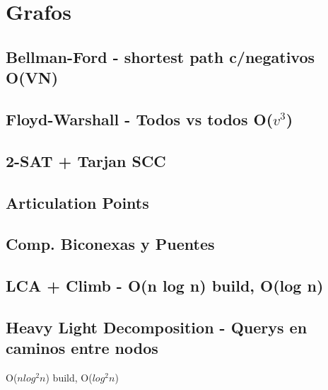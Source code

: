 \section{Grafos}%
\subsection{Bellman-Ford - shortest path c/negativos O(VN)}
\subsection{Floyd-Warshall - Todos vs todos O($v^3$)}
\subsection{2-SAT + Tarjan SCC}
\subsection{Articulation Points}
\subsection{Comp. Biconexas y Puentes}
\subsection{LCA + Climb - O(n log n) build, O(log n)} %
\subsection{Heavy Light Decomposition - Querys en caminos entre nodos}
O($n log^2 n$) build, O($log^2 n$)

